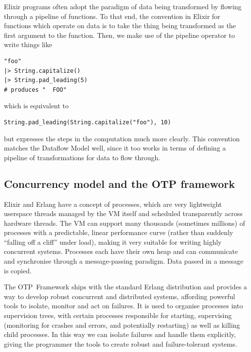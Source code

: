 Elixir programs often adopt the paradigm of data being transformed by flowing through a pipeline of functions.
To that end, the convention in Elixir for functions which operate on data is to take the thing being transformed as the first argument to the function.
Then, we make use of the pipeline operator \exs{|>} to write things like
\begin{verbatim}
"foo"
|> String.capitalize()
|> String.pad_leading(5)
# produces "  FOO"
\end{verbatim}
which is equivalent to
\begin{verbatim}
String.pad_leading(String.capitalize("foo"), 10)		
\end{verbatim}
but expresses the steps in the computation much more clearly.
This convention matches the Dataflow Model well, since it too works in terms of defining a pipeline of transformations for data to flow through.

\subsection{Concurrency model and the OTP framework}\label{sec:prep:elixir:otp}

Elixir and Erlang have a concept of processes, which are very lightweight userspace threads managed by the VM itself and scheduled transparently across hardware threads.
The VM can support many thousands (sometimes millions) of processes with a predictable, linear performance curve (rather than suddenly ``falling off a cliff'' under load), making it very suitable for writing highly concurrent systems.
Processes each have their own heap and can communicate and synchronise through a message-passing paradigm.
Data passed in a message is copied.

The OTP\footnotemark\ Framework ships with the standard Erlang distribution and provides a way to develop robust concurrent and distributed systems, affording powerful tools to isolate, monitor and act on failures.
It is used to organise processes into supervision trees, with certain processes responsible for starting, supervising (monitoring for crashes and errors, and potentially restarting) as well as killing child processes.
In this way we can isolate failures and handle them explicitly, giving the programmer the tools to create robust and failure-tolerant systems.


